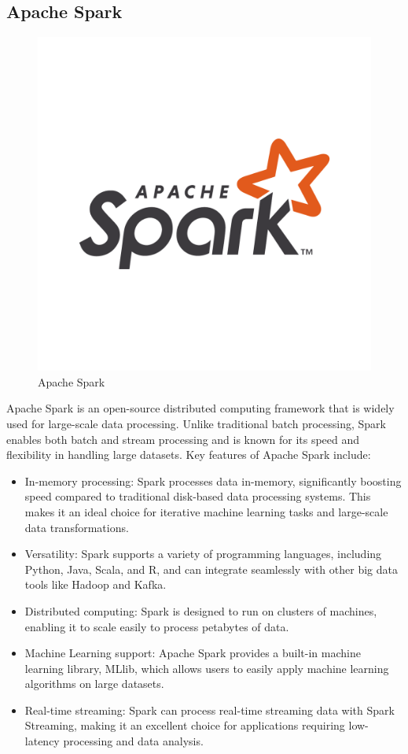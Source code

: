 \subsection{Apache Spark}
\begin{figure}[htp]
    \centering
    \includegraphics[width=0.5\linewidth]{images/training-spark.png}
    \caption{Apache Spark}
\end{figure}
Apache Spark is an open-source distributed computing framework that is widely used for large-scale
data processing. Unlike traditional batch processing, Spark enables both batch and stream processing
and is known for its speed and flexibility in handling large datasets. Key features of Apache Spark
include:
\begin{itemize}
    \item In-memory processing: Spark processes data in-memory, significantly boosting speed compared to
    traditional disk-based data processing systems. This makes it an ideal choice for iterative machine
    learning tasks and large-scale data transformations.
    \item Versatility: Spark supports a variety of programming languages, including Python, Java, Scala,
    and R, and can integrate seamlessly with other big data tools like Hadoop and Kafka.
    \item Distributed computing: Spark is designed to run on clusters of machines, enabling it to scale
    easily to process petabytes of data.
    \item Machine Learning support: Apache Spark provides a built-in machine learning library, MLlib,
    which allows users to easily apply machine learning algorithms on large datasets.
    \item Real-time streaming: Spark can process real-time streaming data with Spark Streaming, making
    it an excellent choice for applications requiring low-latency processing and data analysis.
\end{itemize}
